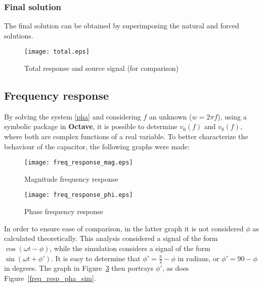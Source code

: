 \subsubsection{Final solution}

The final solution can be obtained by superimposing the natural and forced solutions.

\begin{figure}[H]
  \centering
  \texttt{[image: total.eps]}
  \caption{Total response and source signal (for comparison)}
  \label{fig:tot}
\end{figure}

\subsection{Frequency response}

By solving the system \ref{pha} and considering $f$ an unknown ($w=2\pi f$), using a symbolic package in \textbf{Octave}, it is possible to determine $v_6(f)$ and $v_8(f)$, where both are complex functions of a real variable. To better characterize the behaviour of the capacitor, the following graphs were made:

\begin{figure}[H]
  \centering
  \texttt{[image: freq\_response\_mag.eps]}
  \caption{Magnitude frequency response}
  \label{freq_resp_mag}
\end{figure}

\begin{figure}[H]
  \centering
  \texttt{[image: freq\_response\_phi.eps]}
  \caption{Phase frequency response}
  \label{freq_resp_pha}
\end{figure}

In order to ensure ease of comparison, in the latter graph it is not considered $\phi$ as calculated theoretically. This analysis considered a signal of the form $\cos(\omega t - \phi)$, while the simulation considers a signal of the form $\sin(\omega t + \phi')$. It is easy to determine that $\phi' = \frac{\pi}{2} - \phi$ in radians, or $\phi' = 90 - \phi$ in degrees. The graph in Figure~\ref{freq_resp_pha} then portrays $\phi'$, as does Figure~\ref{freq_resp_pha_sim}.
